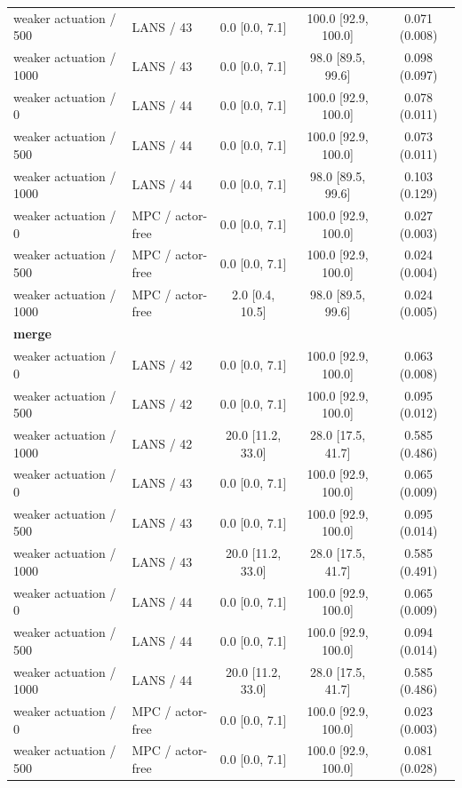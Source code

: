 \begin{longtable}{llccc}
weaker actuation / 500 & LANS / 43 & 0.0 [0.0, 7.1] & 100.0 [92.9, 100.0] & 0.071 (0.008) \\
weaker actuation / 1000 & LANS / 43 & 0.0 [0.0, 7.1] & 98.0 [89.5, 99.6] & 0.098 (0.097) \\
weaker actuation / 0 & LANS / 44 & 0.0 [0.0, 7.1] & 100.0 [92.9, 100.0] & 0.078 (0.011) \\
weaker actuation / 500 & LANS / 44 & 0.0 [0.0, 7.1] & 100.0 [92.9, 100.0] & 0.073 (0.011) \\
weaker actuation / 1000 & LANS / 44 & 0.0 [0.0, 7.1] & 98.0 [89.5, 99.6] & 0.103 (0.129) \\
weaker actuation / 0 & MPC / actor-free & 0.0 [0.0, 7.1] & 100.0 [92.9, 100.0] & 0.027 (0.003) \\
weaker actuation / 500 & MPC / actor-free & 0.0 [0.0, 7.1] & 100.0 [92.9, 100.0] & 0.024 (0.004) \\
weaker actuation / 1000 & MPC / actor-free & 2.0 [0.4, 10.5] & 98.0 [89.5, 99.6] & 0.024 (0.005) \\
\multicolumn{5}{l}{\textbf{merge}} \\
weaker actuation / 0 & LANS / 42 & 0.0 [0.0, 7.1] & 100.0 [92.9, 100.0] & 0.063 (0.008) \\
weaker actuation / 500 & LANS / 42 & 0.0 [0.0, 7.1] & 100.0 [92.9, 100.0] & 0.095 (0.012) \\
weaker actuation / 1000 & LANS / 42 & 20.0 [11.2, 33.0] & 28.0 [17.5, 41.7] & 0.585 (0.486) \\
weaker actuation / 0 & LANS / 43 & 0.0 [0.0, 7.1] & 100.0 [92.9, 100.0] & 0.065 (0.009) \\
weaker actuation / 500 & LANS / 43 & 0.0 [0.0, 7.1] & 100.0 [92.9, 100.0] & 0.095 (0.014) \\
weaker actuation / 1000 & LANS / 43 & 20.0 [11.2, 33.0] & 28.0 [17.5, 41.7] & 0.585 (0.491) \\
weaker actuation / 0 & LANS / 44 & 0.0 [0.0, 7.1] & 100.0 [92.9, 100.0] & 0.065 (0.009) \\
weaker actuation / 500 & LANS / 44 & 0.0 [0.0, 7.1] & 100.0 [92.9, 100.0] & 0.094 (0.014) \\
weaker actuation / 1000 & LANS / 44 & 20.0 [11.2, 33.0] & 28.0 [17.5, 41.7] & 0.585 (0.486) \\
weaker actuation / 0 & MPC / actor-free & 0.0 [0.0, 7.1] & 100.0 [92.9, 100.0] & 0.023 (0.003) \\
weaker actuation / 500 & MPC / actor-free & 0.0 [0.0, 7.1] & 100.0 [92.9, 100.0] & 0.081 (0.028) \\

\end{longtable}
